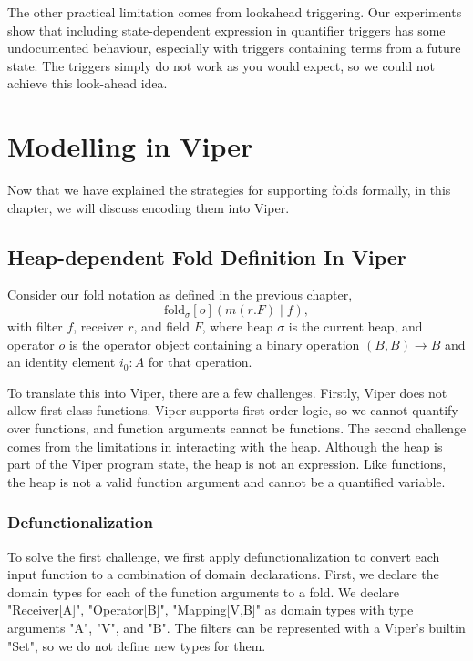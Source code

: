 \documentclass[msc,oneside]{ubcthesis}
\theoremstyle{definition}
\begin{document}
The other practical limitation comes from lookahead triggering. Our experiments show that including state-dependent expression in quantifier triggers has some undocumented behaviour, especially with triggers containing terms from a future state. The triggers simply do not work as you would expect, so we could not achieve this look-ahead idea.

\chapter{Modelling in Viper}
Now that we have explained the strategies for supporting folds formally, in this chapter, we will discuss encoding them into Viper.

\section{Heap-dependent Fold Definition In Viper}
Consider our fold notation as defined in the previous chapter, 
$$\textrm{fold}_{\sigma}[o]( m(r.F) \mid f),$$
with filter $f$, receiver $r$, and field $F$, where heap $\sigma$ is the current heap, and operator $o$ is the operator object containing a binary operation $(B, B) \rightarrow B$ and an identity element $i_0 : A$ for that operation.

To translate this into Viper, there are a few challenges. Firstly, Viper does not allow first-class functions. Viper supports first-order logic, so we cannot quantify over functions, and function arguments cannot be functions. The second challenge comes from the limitations in interacting with the heap. Although the heap is part of the Viper program state, the heap is not an expression. Like functions, the heap is not a valid function argument and cannot be a quantified variable. 

\subsection{Defunctionalization}
To solve the first challenge, we first apply defunctionalization to convert each input function to a combination of domain declarations. First, we declare the domain types for each of the function arguments to a fold. We declare "Receiver[A]", "Operator[B]", "Mapping[V,B]" as domain types with type arguments "A", "V", and "B". The filters can be represented with a Viper's builtin "Set", so we do not define new types for them.
\end{document}
